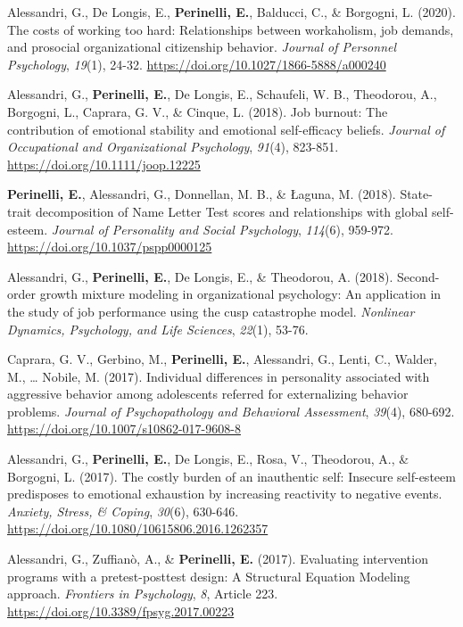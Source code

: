 \documentclass[hidelinks, letterpaper,10pt]{article} %
\begin{document}
\begin{etaremune}
\item Alessandri, G., De Longis, E., \textbf{Perinelli, E.}, Balducci, C., \& Borgogni, L. (2020). The costs of working too hard: Relationships between workaholism, job demands, and prosocial organizational citizenship behavior. \textit{Journal of Personnel Psychology}, \textit{19}(1), 24-32. \url{https://doi.org/10.1027/1866-5888/a000240} 

\item Alessandri, G., \textbf{Perinelli, E.}, De Longis, E., Schaufeli, W. B., Theodorou, A., Borgogni, L., Caprara, G. V., \& Cinque, L. (2018). Job burnout: The contribution of emotional stability and emotional self-efficacy beliefs. \textit{Journal of Occupational and Organizational Psychology}, \textit{91}(4), 823-851. \url{https://doi.org/10.1111/joop.12225} 

\item \textbf{Perinelli, E.}, Alessandri, G., Donnellan, M. B., \& Łaguna, M. (2018). State-trait decomposition of Name Letter Test scores and relationships with global self-esteem. \textit{Journal of Personality and Social Psychology}, \textit{114}(6), 959-972. \url{https://doi.org/10.1037/pspp0000125} 

\item Alessandri, G., \textbf{Perinelli, E.}, De Longis, E., \& Theodorou, A. (2018). Second-order growth mixture modeling in organizational psychology: An application in the study of job performance using the cusp catastrophe model. \textit{Nonlinear Dynamics, Psychology, and Life Sciences}, \textit{22}(1), 53-76.

\item Caprara, G. V., Gerbino, M., \textbf{Perinelli, E.}, Alessandri, G., Lenti, C., Walder, M., … Nobile, M. (2017). Individual differences in personality associated with aggressive behavior among adolescents referred for externalizing behavior problems. \textit{Journal of Psychopathology and Behavioral Assessment}, \textit{39}(4), 680-692. \url{https://doi.org/10.1007/s10862-017-9608-8} 

\item Alessandri, G., \textbf{Perinelli, E.}, De Longis, E., Rosa, V., Theodorou, A., \& Borgogni, L. (2017). The costly burden of an inauthentic self: Insecure self-esteem predisposes to emotional exhaustion by increasing reactivity to negative events. \textit{Anxiety, Stress, \& Coping}, \textit{30}(6), 630-646. \url{https://doi.org/10.1080/10615806.2016.1262357} 

\item Alessandri, G., Zuffianò, A., \& \textbf{Perinelli, E.} (2017). Evaluating intervention programs with a pretest-posttest design: A Structural Equation Modeling approach. \textit{Frontiers in Psychology}, \textit{8}, Article 223. \url{https://doi.org/10.3389/fpsyg.2017.00223} 


\end{etaremune}
\end{document}
